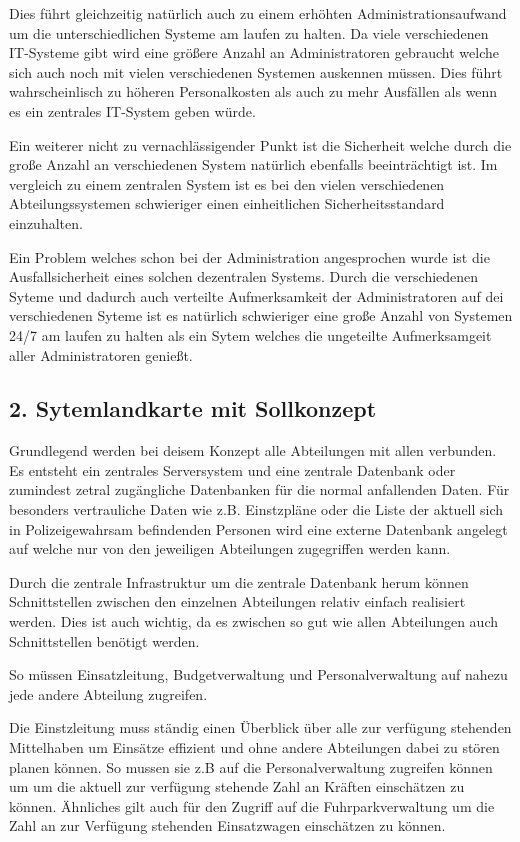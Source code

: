 \documentclass[12pt,utf8]{scrartcl}
\begin{document}
Dies führt gleichzeitig natürlich auch zu einem erhöhten Administrationsaufwand um die unterschiedlichen Systeme am laufen zu halten. Da viele verschiedenen IT-Systeme gibt wird eine größere Anzahl an Administratoren gebraucht welche sich auch noch  mit vielen verschiedenen Systemen auskennen müssen. Dies führt wahrscheinlisch zu höheren Personalkosten als auch zu mehr Ausfällen als wenn es ein zentrales IT-System geben würde.

Ein weiterer nicht zu vernachlässigender Punkt ist die Sicherheit welche durch die große Anzahl an verschiedenen System natürlich ebenfalls beeinträchtigt ist. Im vergleich zu einem zentralen System ist es bei den vielen verschiedenen Abteilungssystemen schwieriger einen einheitlichen Sicherheitsstandard einzuhalten.

Ein Problem welches schon bei der Administration angesprochen wurde ist die Ausfallsicherheit eines solchen dezentralen Systems. Durch die verschiedenen Syteme und dadurch auch verteilte Aufmerksamkeit der Administratoren auf dei verschiedenen Syteme ist es natürlich schwieriger eine große Anzahl von Systemen 24/7 am laufen zu halten als ein Sytem welches die ungeteilte Aufmerksamgeit aller Administratoren genießt.


\subsection*{\label{sub:thema}2. Sytemlandkarte mit Sollkonzept}

Grundlegend werden bei deisem Konzept alle Abteilungen mit allen verbunden. Es entsteht ein zentrales Serversystem und eine zentrale Datenbank oder zumindest zetral zugängliche Datenbanken für die normal anfallenden Daten. Für besonders vertrauliche Daten wie z.B. Einstzpläne oder die Liste der aktuell sich in Polizeigewahrsam befindenden Personen wird eine externe Datenbank angelegt auf welche nur von den jeweiligen Abteilungen zugegriffen werden kann.

Durch die zentrale Infrastruktur um die zentrale Datenbank herum können Schnittstellen zwischen den einzelnen Abteilungen relativ einfach realisiert werden. Dies ist auch wichtig, da es zwischen so gut wie allen Abteilungen auch Schnittstellen benötigt werden. 

So müssen Einsatzleitung, Budgetverwaltung und Personalverwaltung auf nahezu jede andere Abteilung zugreifen.

Die Einstzleitung muss ständig einen Überblick über alle zur verfügung stehenden Mittelhaben um Einsätze effizient und ohne andere Abteilungen dabei zu stören planen können. So mussen sie z.B auf die Personalverwaltung zugreifen können um um die aktuell zur verfügung stehende Zahl an Kräften einschätzen zu können. Ähnliches gilt auch für den Zugriff auf die Fuhrparkverwaltung um die Zahl an zur Verfügung stehenden Einsatzwagen einschätzen zu können.
\end{document}
